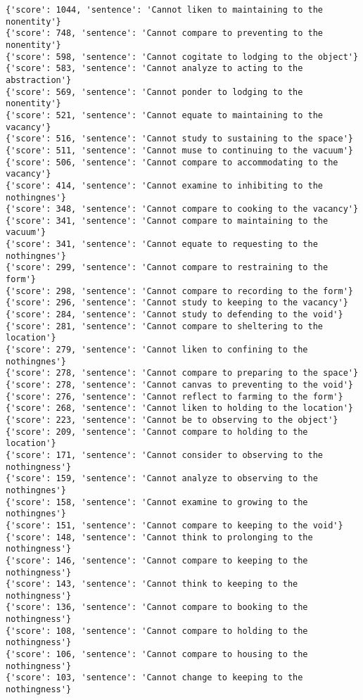 \documentclass[12pt,a4paper,oneside]{book}
\begin{document}
\begin{verbatim}
{'score': 1044, 'sentence': 'Cannot liken to maintaining to the nonentity'}
{'score': 748, 'sentence': 'Cannot compare to preventing to the nonentity'}
{'score': 598, 'sentence': 'Cannot cogitate to lodging to the object'}
{'score': 583, 'sentence': 'Cannot analyze to acting to the abstraction'}
{'score': 569, 'sentence': 'Cannot ponder to lodging to the nonentity'}
{'score': 521, 'sentence': 'Cannot equate to maintaining to the vacancy'}
{'score': 516, 'sentence': 'Cannot study to sustaining to the space'}
{'score': 511, 'sentence': 'Cannot muse to continuing to the vacuum'}
{'score': 506, 'sentence': 'Cannot compare to accommodating to the vacancy'}
{'score': 414, 'sentence': 'Cannot examine to inhibiting to the nothingnes'}
{'score': 348, 'sentence': 'Cannot compare to cooking to the vacancy'}
{'score': 341, 'sentence': 'Cannot compare to maintaining to the vacuum'}
{'score': 341, 'sentence': 'Cannot equate to requesting to the nothingnes'}
{'score': 299, 'sentence': 'Cannot compare to restraining to the form'}
{'score': 298, 'sentence': 'Cannot compare to recording to the form'}
{'score': 296, 'sentence': 'Cannot study to keeping to the vacancy'}
{'score': 284, 'sentence': 'Cannot study to defending to the void'}
{'score': 281, 'sentence': 'Cannot compare to sheltering to the location'}
{'score': 279, 'sentence': 'Cannot liken to confining to the nothingnes'}
{'score': 278, 'sentence': 'Cannot compare to preparing to the space'}
{'score': 278, 'sentence': 'Cannot canvas to preventing to the void'}
{'score': 276, 'sentence': 'Cannot reflect to farming to the form'}
{'score': 268, 'sentence': 'Cannot liken to holding to the location'}
{'score': 223, 'sentence': 'Cannot be to observing to the object'}
{'score': 209, 'sentence': 'Cannot compare to holding to the location'}
{'score': 171, 'sentence': 'Cannot consider to observing to the nothingness'}
{'score': 159, 'sentence': 'Cannot analyze to observing to the nothingnes'}
{'score': 158, 'sentence': 'Cannot examine to growing to the nothingnes'}
{'score': 151, 'sentence': 'Cannot compare to keeping to the void'}
{'score': 148, 'sentence': 'Cannot think to prolonging to the nothingness'}
{'score': 146, 'sentence': 'Cannot compare to keeping to the nothingness'}
{'score': 143, 'sentence': 'Cannot think to keeping to the nothingness'}
{'score': 136, 'sentence': 'Cannot compare to booking to the nothingness'}
{'score': 108, 'sentence': 'Cannot compare to holding to the nothingness'}
{'score': 106, 'sentence': 'Cannot compare to housing to the nothingness'}
{'score': 103, 'sentence': 'Cannot change to keeping to the nothingness'}

\end{verbatim}
\end{document}
